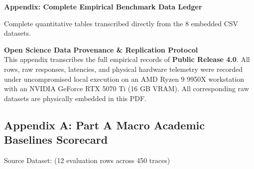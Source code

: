 \vspace{1.0em}
\appendix
\begin{center}
  {\Large\bfseries\color{brandnavy}\sffamily Appendix: Complete Empirical Benchmark Data Ledger}
  
  \vspace{0.2em}
  \textsf{\small Complete quantitative tables transcribed directly from the 8 embedded CSV datasets.}
\end{center}
\vspace{-0.2em}
\vspace{0.4em}

\noindent\textbf{\textsf{\color{brandnavy}Open Science Data Provenance \& Replication Protocol}}\\[0.2em]
\noindent This appendix transcribes the full empirical records of \textbf{Public Release 4.0}. All rows, raw responses, latencies, and physical hardware telemetry were recorded under uncompromised local execution on an AMD Ryzen 9 9950X workstation with an NVIDIA GeForce RTX 5070 Ti (16 GB VRAM). All corresponding raw datasets are physically embedded in this PDF.

\vspace{0.5em}
\subsection*{Appendix A: Part A Macro Academic Baselines Scorecard}
\noindent\textsf{\footnotesize Source Dataset:  (12 evaluation rows across 450 traces)}
\vspace{0.2em}

